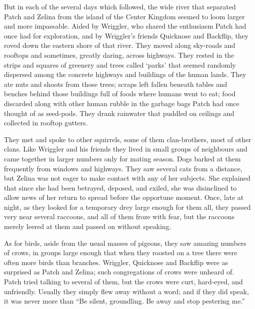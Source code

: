 \documentclass[ebook,oneside,openany,17pt]{memoir}
\newenvironment{tolerant}[1]{%
  \par\tolerance=#1\relax
}{%
  \par
}
\begin{document}
\begin{tolerant}{1000}
But in each of the several days which followed, the wide river that
separated Patch and Zelina from the island of the Center Kingdom
seemed to loom larger and more impassable. Aided by Wriggler, who
shared the enthusiasm Patch had once had for exploration, and by
Wriggler’s friends Quicknose and Backflip, they roved down the eastern
shore of that river. They moved along sky-roads and rooftops and
sometimes, greatly daring, across highways. They rested in the strips
and squares of greenery and trees called ‘parks’ that seemed randomly
dispersed among the concrete highways and buildings of the human
lands. They ate nuts and shoots from those trees; scraps left fallen
beneath tables and benches behind those buildings full of foods where
humans went to eat; food discarded along with other human rubble in
the garbage bags Patch had once thought of as seed-pods. They drank
rainwater that puddled on ceilings and collected in rooftop gutters.
\end{tolerant}

\begin{tolerant}{2000}
They met and spoke to other squirrels, some of them clan-brothers,
most of other clans. Like Wriggler and his friends they lived in small
groups of neighbours and came together in larger numbers only for
mating season. Dogs barked at them frequently from windows and
highways. They saw several cats from a distance, but Zelina was not
eager to make contact with any of her subjects. She explained that
since she had been betrayed, deposed, and exiled, she was disinclined
to allow news of her return to spread before the opportune
moment. Once, late at night, as they looked for a temporary drey large
enough for them all, they passed very near several raccoons, and all
of them froze with fear, but the raccoons merely leered at them and
passed on without speaking.
\end{tolerant}

\begin{tolerant}{2000}
As for birds, aside from the usual masses of pigeons, they saw amazing
numbers of crows, in groups large enough that when they roosted on a
tree there were often more birds than branches. Wriggler, Quick\-nose
and Backflip were as surprised as Patch and Zelina; such congregations
of crows were unheard of. Patch tried talking to several of them, but
the crows were curt, hard-eyed, and unfriendly. Usually they simply
flew away without a word; and if they did speak, it was never more
than “Be silent, groundling. Be away and stop pestering me.”
\end{tolerant}
\end{document}
